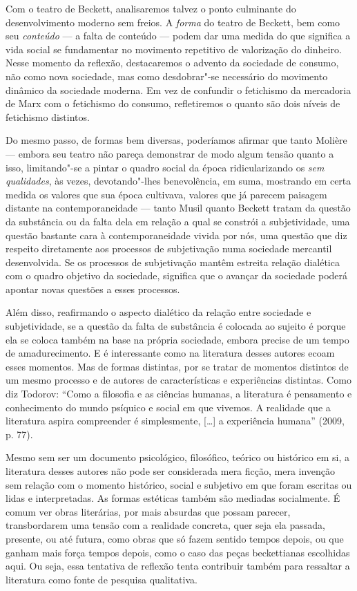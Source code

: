 Com o teatro de Beckett, analisaremos talvez o ponto culminante do
desenvolvimento moderno sem freios. A \emph{forma} do teatro de
Beckett, bem como seu
\emph{conteúdo} --- a falta de conteúdo --- podem dar uma medida do que
significa a vida social se fundamentar no movimento repetitivo de
valorização do dinheiro. Nesse momento da reflexão, destacaremos o
advento da sociedade de consumo, não como nova sociedade, mas como
desdobrar"-se necessário do movimento dinâmico da sociedade moderna. Em vez de
confundir o fetichismo da mercadoria de Marx com o fetichismo do
consumo, refletiremos o quanto são dois níveis de fetichismo distintos.

Do mesmo passo, de formas bem diversas, poderíamos afirmar que tanto
Molière --- embora seu teatro não pareça demonstrar de modo algum tensão
quanto a isso, limitando"-se a pintar o quadro social da época
ridicularizando os \emph{sem} \emph{qualidades}, às vezes,
devotando"-lhes benevolência, em suma, mostrando em certa medida os
valores que sua época cultivava, valores que já parecem paisagem
distante na contemporaneidade --- tanto Musil quanto Beckett tratam da
questão da substância ou da falta dela em relação a qual se constrói a
subjetividade, uma questão bastante cara à contemporaneidade vivida por
nós, uma questão que diz respeito diretamente aos processos de
subjetivação numa sociedade mercantil desenvolvida. Se os processos de
subjetivação mantêm estreita relação dialética com o quadro objetivo da
sociedade, significa que o avançar da sociedade poderá apontar novas
questões a esses processos.

Além disso, reafirmando o aspecto dialético da relação entre sociedade e
subjetividade, se a questão da falta de substância é colocada ao sujeito
é porque ela se coloca também na base na própria sociedade, embora
precise de um tempo de amadurecimento. E é interessante como na
literatura desses autores ecoam esses momentos. Mas de formas distintas,
por se tratar de momentos distintos de um mesmo processo e de autores de
características e experiências distintas. Como diz Todorov: ``Como a
filosofia e as ciências humanas, a literatura é pensamento e
conhecimento do mundo psíquico e social em que vivemos. A realidade que
a literatura aspira compreender é simplesmente, [\ldots{}] a experiência
humana'' (2009, p. 77).

Mesmo sem ser um documento psicológico, filosófico, teórico ou histórico
em si, a literatura desses autores não pode ser considerada mera ficção,
mera invenção sem relação com o momento histórico, social e subjetivo em que
foram escritas ou lidas e interpretadas. As formas estéticas também são mediadas
socialmente. É comum ver obras literárias, por mais absurdas que possam parecer,
transbordarem uma tensão com a realidade concreta, quer seja ela passada,
presente, ou até futura, como obras que só fazem sentido tempos depois,
ou que ganham mais força tempos depois, como o caso das peças
beckettianas escolhidas aqui. Ou seja, essa tentativa de reflexão tenta
contribuir também para ressaltar a literatura como fonte de pesquisa
qualitativa.


